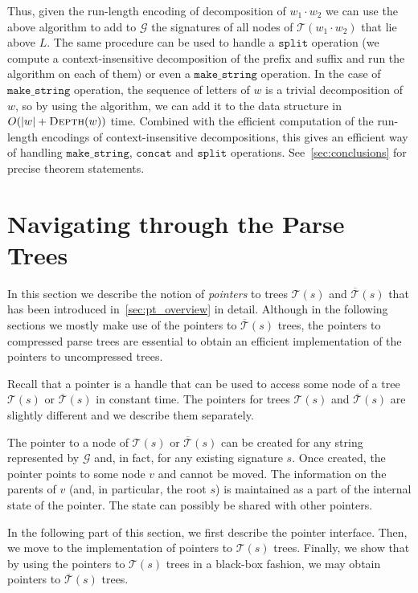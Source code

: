 \documentclass[a4paper]{article}
\theoremstyle{remark}
\newcommand{\makeop}{\mathtt{make\_string}}
\newcommand{\concop}{\mathtt{concat}}
\newcommand{\splitop}{\mathtt{split}}
\newcommand{\depth}{\textsc{Depth}}
\newcommand{\str}{w}
\newcommand{\grammar}{\mathcal{G}}
\newcommand{\stree}{\mathcal{T}}
\newcommand{\ustree}{\mathcal{\overline{T}}}
\begin{document}
Thus, given the run-length encoding of decomposition of $\str_1 \cdot \str_2$ we can use the above algorithm to add to $\grammar$ the signatures of all nodes of $\stree(\str_1 \cdot \str_2)$ that lie above $L$.
The same procedure can be used to handle a $\splitop$ operation (we compute a context-insensitive decomposition of the prefix and suffix and run the algorithm on each of them) or even a $\makeop$ operation.
In the case of $\makeop$ operation, the sequence of letters of $\str$ is a trivial decomposition of $\str$, so by using the algorithm, we can add it to the data structure in $O(|\str|+\depth(\str))$ time.
Combined with the efficient computation of the run-length encodings of context-insensitive decompositions, this gives an efficient way of handling $\makeop$, $\concop$ and $\splitop$ operations.
See~\cref{sec:conclusions} for precise theorem statements.

\section{Navigating through the Parse Trees}\label{sec:pointers}
In this section we describe the notion of \emph{pointers} to trees $\stree(s)$ and $\ustree(s)$ that has been introduced in~\cref{sec:pt_overview} in detail.
Although in the following sections we mostly make use of the pointers
to $\ustree(s)$ trees, the pointers to compressed parse trees
are essential to obtain an efficient implementation
of the pointers to uncompressed trees.

Recall that a pointer is a handle that can be used to access some node of a tree $\stree(s)$ or $\ustree(s)$ in constant time.
The pointers for trees $\stree(s)$ and $\ustree(s)$ are slightly different and we describe them separately.

The pointer to a node of $\stree(s)$ or $\ustree(s)$ can be created for any string represented by $\grammar$ and, in fact, for any existing signature $s$.
Once created, the pointer points to some node $v$ and cannot be moved.
The information on the parents of $v$ (and, in particular, the root $s$)
is maintained as a part of the internal state of the pointer.
The state can possibly be shared with other pointers.

In the following part of this section, we first describe the pointer interface.
Then, we move to the implementation of pointers to $\stree(s)$ trees.
Finally, we show that by using the pointers to $\stree(s)$ trees in a black-box fashion, we may obtain pointers to $\ustree(s)$ trees.
\end{document}
